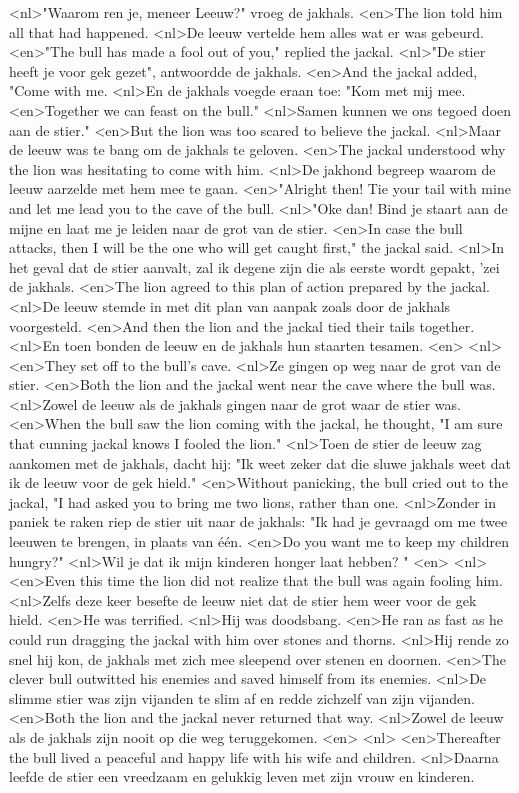 <nl>"Waarom ren je, meneer Leeuw?" vroeg de jakhals.
<en>The lion told him all that had happened.
<nl>De leeuw vertelde hem alles wat er was gebeurd.
<en>"The bull has made a fool out of you," replied the jackal.
<nl>"De stier heeft je voor gek gezet", antwoordde de jakhals.
<en>And the jackal added, "Come with me.
<nl>En de jakhals voegde eraan toe: "Kom met mij mee.
<en>Together we can feast on the bull."
<nl>Samen kunnen we ons tegoed doen aan de stier."
<en>But the lion was too scared to believe the jackal.
<nl>Maar de leeuw was te bang om de jakhals te geloven.
<en>The jackal understood why the lion was hesitating to come with him.
<nl>De jakhond begreep waarom de leeuw aarzelde met hem mee te gaan.
<en>"Alright then! Tie your tail with mine and let me lead you to the cave of the bull.
<nl>"Oke dan! Bind je staart aan de mijne en laat me je leiden naar de grot van de stier.
<en>In case the bull attacks, then I will be the one who will get caught first," the jackal said.
<nl>In het geval dat de stier aanvalt, zal ik degene zijn die als eerste wordt gepakt, 'zei de jakhals.
<en>The lion agreed to this plan of action prepared by the jackal.
<nl>De leeuw stemde in met dit plan van aanpak zoals door de jakhals voorgesteld.
<en>And then the lion and the jackal tied their tails together.
<nl>En toen bonden de leeuw en de jakhals hun staarten tesamen.
<en>
<nl>
<en>They set off to the bull’s cave.
<nl>Ze gingen op weg naar de grot van de stier.
<en>Both the lion and the jackal went near the cave where the bull was.
<nl>Zowel de leeuw als de jakhals gingen naar de grot waar de stier was.
<en>When the bull saw the lion coming with the jackal, he thought, "I am sure that cunning jackal knows I fooled the lion."
<nl>Toen de stier de leeuw zag aankomen met de jakhals, dacht hij: "Ik weet zeker dat die sluwe jakhals weet dat ik de leeuw voor de gek hield."
<en>Without panicking, the bull cried out to the jackal, "I had asked you to bring me two lions, rather than one.
<nl>Zonder in paniek te raken riep de stier uit naar de jakhals: "Ik had je gevraagd om me twee leeuwen te brengen, in plaats van één.
<en>Do you want me to keep my children hungry?"
<nl>Wil je dat ik mijn kinderen honger laat hebben? "
<en>
<nl>
<en>Even this time the lion did not realize that the bull was again fooling him.
<nl>Zelfs deze keer besefte de leeuw niet dat de stier hem weer voor de gek hield.
<en>He was terrified.
<nl>Hij was doodsbang.
<en>He ran as fast as he could run dragging the jackal with him over stones and thorns.
<nl>Hij rende zo snel hij kon, de jakhals met zich mee sleepend over stenen en doornen.
<en>The clever bull outwitted his enemies and saved himself from its enemies.
<nl>De slimme stier was zijn vijanden te slim af en redde zichzelf van zijn vijanden.
<en>Both the lion and the jackal never returned that way.
<nl>Zowel de leeuw als de jakhals zijn nooit op die weg teruggekomen.
<en>
<nl>
<en>Thereafter the bull lived a peaceful and happy life with his wife and children.
<nl>Daarna leefde de stier een vreedzaam en gelukkig leven met zijn vrouw en kinderen.
